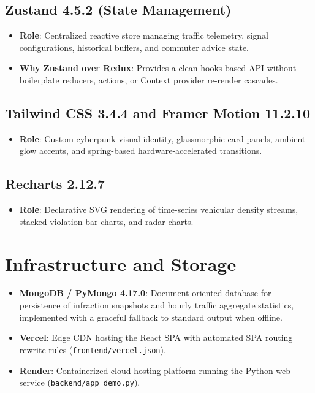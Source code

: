 \subsection{Zustand 4.5.2 (State Management)}
\begin{itemize}[leftmargin=*]
    \item \textbf{Role}: Centralized reactive store managing traffic telemetry, signal configurations, historical buffers, and commuter advice state.
    \item \textbf{Why Zustand over Redux}: Provides a clean hooks-based API without boilerplate reducers, actions, or Context provider re-render cascades.
\end{itemize}

\subsection{Tailwind CSS 3.4.4 and Framer Motion 11.2.10}
\begin{itemize}[leftmargin=*]
    \item \textbf{Role}: Custom cyberpunk visual identity, glassmorphic card panels, ambient glow accents, and spring-based hardware-accelerated transitions.
\end{itemize}

\subsection{Recharts 2.12.7}
\begin{itemize}[leftmargin=*]
    \item \textbf{Role}: Declarative SVG rendering of time-series vehicular density streams, stacked violation bar charts, and radar charts.
\end{itemize}

\section{Infrastructure and Storage}
\begin{itemize}[leftmargin=*]
    \item \textbf{MongoDB / PyMongo 4.17.0}: Document-oriented database for persistence of infraction snapshots and hourly traffic aggregate statistics, implemented with a graceful fallback to standard output when offline.
    \item \textbf{Vercel}: Edge CDN hosting the React SPA with automated SPA routing rewrite rules (\texttt{frontend/vercel.json}).
    \item \textbf{Render}: Containerized cloud hosting platform running the Python web service (\texttt{backend/app\_demo.py}).
\end{itemize}
